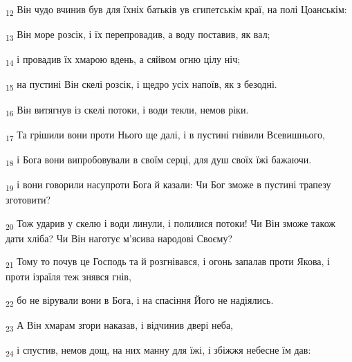 \begin{tcolorbox}
\textsubscript{12} Він чудо вчинив був для їхніх батьків ув єгипетськім краї, на полі Цоанськім:
\end{tcolorbox}
\begin{tcolorbox}
\textsubscript{13} Він море розсік, і їх перепровадив, а воду поставив, як вал;
\end{tcolorbox}
\begin{tcolorbox}
\textsubscript{14} і провадив їх хмарою вдень, а сяйвом огню цілу ніч;
\end{tcolorbox}
\begin{tcolorbox}
\textsubscript{15} на пустині Він скелі розсік, і щедро усіх напоїв, як з безодні.
\end{tcolorbox}
\begin{tcolorbox}
\textsubscript{16} Він витягнув із скелі потоки, і води текли, немов ріки.
\end{tcolorbox}
\begin{tcolorbox}
\textsubscript{17} Та грішили вони проти Нього ще далі, і в пустині гнівили Всевишнього,
\end{tcolorbox}
\begin{tcolorbox}
\textsubscript{18} і Бога вони випробовували в своїм серці, для душ своїх їжі бажаючи.
\end{tcolorbox}
\begin{tcolorbox}
\textsubscript{19} і вони говорили насупроти Бога й казали: Чи Бог зможе в пустині трапезу зготовити?
\end{tcolorbox}
\begin{tcolorbox}
\textsubscript{20} Тож ударив у скелю і води линули, і полилися потоки! Чи Він зможе також дати хліба? Чи Він наготує м'ясива народові Своєму?
\end{tcolorbox}
\begin{tcolorbox}
\textsubscript{21} Тому то почув це Господь та й розгнівався, і огонь запалав проти Якова, і проти ізраїля теж знявся гнів,
\end{tcolorbox}
\begin{tcolorbox}
\textsubscript{22} бо не вірували вони в Бога, і на спасіння Його не надіялись.
\end{tcolorbox}
\begin{tcolorbox}
\textsubscript{23} А Він хмарам згори наказав, і відчинив двері неба,
\end{tcolorbox}
\begin{tcolorbox}
\textsubscript{24} і спустив, немов дощ, на них манну для їжі, і збіжжя небесне їм дав:
\end{tcolorbox}
